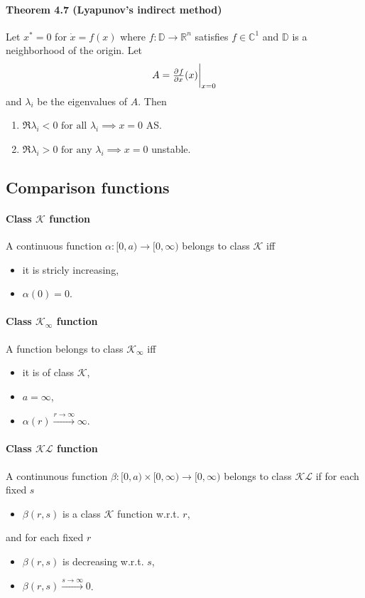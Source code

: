 \paragraph{Theorem 4.7 (Lyapunov's indirect method)}
Let $x^* = 0$ for $\dot{x} = f(x)$ where $f : \mathbb{D} \rightarrow \mathbb{R}^n$ satisfies $f \in \mathbb{C}^1$ and $\mathbb{D}$ is a neighborhood of the origin. Let
\begin{equation}
	A = \pd{f}{x} (x) \evalat{x = 0}
\end{equation}
and $\lambda_i$ be the eigenvalues of $A$. Then
\begin{enumerate}
	\item $\Re \lambda_i < 0 \mbox{ for all } \lambda_i \implies x = 0$ AS.
	\item $\Re \lambda_i > 0 \mbox{ for any } \lambda_i \implies x = 0$ unstable.
\end{enumerate}

\subsection{Comparison functions}
\paragraph{Class $\mathcal{K}$ function}
A continuous function $\alpha : [0,a) \to [0, \infty)$ belongs to class $\mathcal{K}$ iff
\begin{itemize}
	\item it is stricly increasing,
	\item $\alpha(0) = 0$.
\end{itemize}

\paragraph{Class $\mathcal{K}_\infty$ function}
A function belongs to class $\mathcal{K}_\infty$ iff
\begin{itemize}
	\item it is of class $\mathcal{K}$,
	\item $a = \infty$,
	\item $\alpha(r) \xrightarrow{r \to \infty} \infty$.
\end{itemize}

\paragraph{Class $\mathcal{KL}$ function}
A continunous function $\beta : [0,a) \times [0,\infty) \to [0,\infty)$ belongs to class $\mathcal{KL}$ if for each fixed $s$
\begin{itemize}
	\item $\beta(r,s)$ is a class $\mathcal{K}$ function w.r.t. $r$,
\end{itemize}
and for each fixed $r$
\begin{itemize}
	\item $\beta(r,s)$ is decreasing w.r.t. $s$,
	\item $\beta(r,s) \xrightarrow{s \to \infty} 0$.
\end{itemize}

